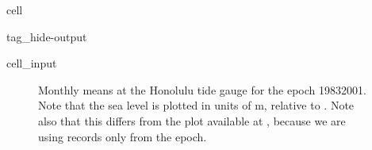 \documentclass[letterpaper,10pt,english]{jupyterBook}
\begin{document}
\begin{sphinxuseclass}{cell}
\begin{sphinxuseclass}{tag_hide-output}
\begin{sphinxVerbatimInput}
\begin{sphinxuseclass}{cell_input}
\begin{sphinxVerbatim}[commandchars=\\\{\}]
    

  

\end{sphinxVerbatim}

\end{sphinxuseclass}\end{sphinxVerbatimInput}

\end{sphinxuseclass}
\end{sphinxuseclass}
\begin{figure}[htbp]
\centering
\capstart

\noindent{}
\caption{Monthly means at the Honolulu tide gauge for the epoch 1983\sphinxhyphen{}2001. Note that the sea level is plotted in units of m, relative to . Note also that this differs from the plot available at , because we are using records only from the epoch.}\label{\detokenize{notebooks/regional_and_local/SL_anomaly_intra-annual:sl-mma-intra}}\end{figure}
\end{document}
